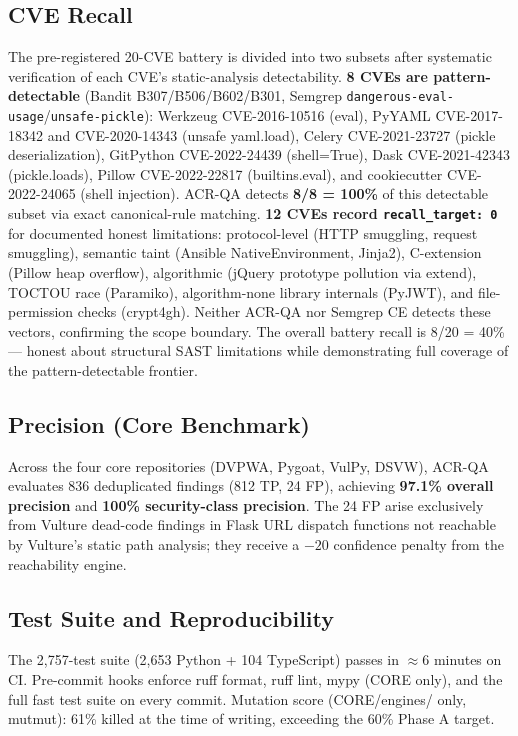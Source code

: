 \documentclass[conference]{IEEEtran}
\begin{document}
\subsection{CVE Recall}

The pre-registered 20-CVE battery is divided into two subsets after systematic verification of each CVE's static-analysis detectability. \textbf{8 CVEs are pattern-detectable} (Bandit B307/B506/B602/B301, Semgrep \texttt{dangerous-eval-usage}/\texttt{unsafe-pickle}): Werkzeug CVE-2016-10516 (eval), PyYAML CVE-2017-18342 and CVE-2020-14343 (unsafe yaml.load), Celery CVE-2021-23727 (pickle deserialization), GitPython CVE-2022-24439 (shell=True), Dask CVE-2021-42343 (pickle.loads), Pillow CVE-2022-22817 (builtins.eval), and cookiecutter CVE-2022-24065 (shell injection). ACR-QA detects \textbf{8/8 = 100\%} of this detectable subset via exact canonical-rule matching. \textbf{12 CVEs record \texttt{recall\_target: 0}} for documented honest limitations: protocol-level (HTTP smuggling, request smuggling), semantic taint (Ansible NativeEnvironment, Jinja2), C-extension (Pillow heap overflow), algorithmic (jQuery prototype pollution via extend), TOCTOU race (Paramiko), algorithm-none library internals (PyJWT), and file-permission checks (crypt4gh). Neither ACR-QA nor Semgrep CE detects these vectors, confirming the scope boundary. The overall battery recall is 8/20 = 40\% — honest about structural SAST limitations while demonstrating full coverage of the pattern-detectable frontier.

\subsection{Precision (Core Benchmark)}

Across the four core repositories (DVPWA, Pygoat, VulPy, DSVW), ACR-QA evaluates 836 deduplicated findings (812 TP, 24 FP), achieving \textbf{97.1\% overall precision} and \textbf{100\% security-class precision}. The 24 FP arise exclusively from Vulture dead-code findings in Flask URL dispatch functions not reachable by Vulture's static path analysis; they receive a $-20$ confidence penalty from the reachability engine.

\subsection{Test Suite and Reproducibility}

The 2,757-test suite (2,653 Python + 104 TypeScript) passes in $\approx$6 minutes on CI. Pre-commit hooks enforce ruff format, ruff lint, mypy (CORE only), and the full fast test suite on every commit. Mutation score (CORE/engines/ only, mutmut): 61\% killed at the time of writing, exceeding the 60\% Phase A target.
\end{document}
